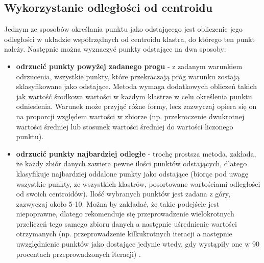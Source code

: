 \documentclass[eng,printmode]{mgr}
\begin{document}
\subsection{Wykorzystanie odległości od centroidu}
\label{sec:kmean_dist}
Jednym ze sposobów określania punktu jako odstającego jest obliczenie jego odległości w układzie współrzędnych od centroidu klastra, do którego ten punkt należy. Następnie można wyznaczyć punkty odstające na dwa sposoby:
\begin{itemize}
\item \textbf{odrzucić punkty powyżej zadanego progu} - z zadanym warunkiem odrzucenia, wszystkie punkty, które przekraczają próg warunku zostają sklasyfikowane jako odstające. Metoda wymaga dodatkowych obliczeń takich jak wartość środkowa wartości w każdym klastrze w celu określenia punktu odniesienia. Warunek może przyjąć różne formy, lecz zazwyczaj opiera się on na proporcji względem wartości w zbiorze (np. przekroczenie dwukrotnej wartości średniej lub stosunek wartości średniej do wartości liczonego punktu).
\item \textbf{odrzucić punkty najbardziej odległe} - trochę prostsza metoda, zakłada, że każdy zbiór danych zawiera pewne ilości punktów odstających, dlatego klasyfikuje najbardziej oddalone punkty jako odstające (biorąc pod uwagę wszystkie punkty, ze wszystkich klastrów, posortowane wartościami odległości od swoich centroidów). Ilość wybranych punktów jest zadana z góry, zazwyczaj około 5-10. Można by zakładać, że takie podejście jest niepoprawne, dlatego rekomenduje się przeprowadzenie wielokrotnych przeliczeń tego samego zbioru danych a następnie uśrednienie wartości otrzymanych (np. przeprowadzenie kilkukrotnych iteracji a następnie uwzględnienie punktów jako dostające jedynie wtedy, gdy wystąpiły one w 90 procentach przeprowadzonych iteracji)  \cite{kmean_dist}. 
\end{itemize}
\end{document}
